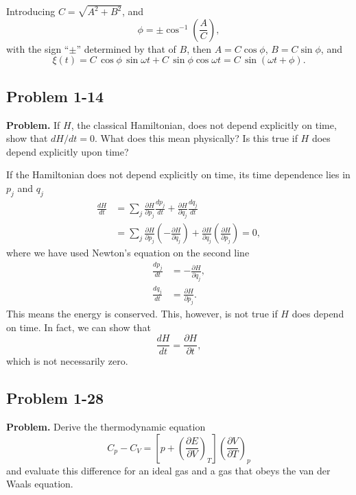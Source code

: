 \documentclass[twocolumn, 10pt]{article}
\numberwithin{equation}{section}
\newenvironment{problem}
{\par\medskip\sffamily \color{problue}
  \textbf{Problem. }\ignorespaces}
{\medskip}
\newenvironment{solution}[1][\empty]
{\par\medskip
  \textbf{\ifx\empty#1{Solution.}\relax\else{#1}\fi} \ignorespaces}
{\medskip}
\begin{document}
\begin{solution}
Introducing $C = \sqrt{A^2 + B^2}$,
and
$$\phi = \pm \cos^{-1} \left( \frac A C \right),$$
with the sign ``$\pm$'' determined by that of $B$,
then $A = C \cos\phi$, $B = C \sin\phi$, and
$$
\xi(t) = C \, \cos\phi \, \sin \omega t + C \, \sin\phi \cos \omega t
= C \, \sin(\omega t + \phi).
$$
\end{solution}


\subsection{Problem 1-14}

\begin{problem}
If $H$, the classical Hamiltonian, does not depend explicitly on time,
show that $dH/dt = 0$.
What does this mean physically?
Is this true if $H$ does depend explicitly upon time?
\end{problem}

\begin{solution}
If the Hamiltonian does not depend explicitly on time,
its time dependence lies in $p_j$ and $q_j$
\begin{align*}
  \frac{dH}{dt}
  &= \sum_j
  \frac{ \partial H } { \partial p_j}
  \frac{ d p_j } { d t }
   +
  \frac{ \partial H } { \partial q_j}
  \frac{ d q_j } { d t }
  \\
  &= \sum_j
  \frac{ \partial H } { \partial p_j}
  \left( - \frac{ \partial H } { \partial q_j} \right)
   +
  \frac{ \partial H } { \partial q_j}
  \left( \frac{ \partial H } { \partial p_j} \right)
  = 0,
\end{align*}
where we have used Newton's equation
on the second line
\begin{align*}
  \frac{ d p_j } { d t }
  &=
  - \frac{ \partial H } { \partial q_j}
  ,
  \\
  \frac{ d q_j } { d t }
  &= \frac{ \partial H } { \partial p_j}
  .
\end{align*}
This means the energy is conserved.
This, however, is not true if $H$ does depend on time.
%
In fact, we can show that
$$
  \frac{ d H } { d t }
  =
  \frac{ \partial H } { \partial t }
  ,
$$
which is not necessarily zero.
\end{solution}


\subsection{Problem 1-28}

\begin{problem}
  Derive the thermodynamic equation
  \begin{equation}
    C_p - C_V
    = \left[ p + \left( \frac{ \partial E } { \partial V } \right)_T \right]
    \left( \frac{ \partial V } { \partial T } \right)_p
    \label{eq:CpCV1}
  \end{equation}
  and evaluate this difference for an ideal gas
  and a gas that obeys the van der Waals equation.
\end{problem}
\end{document}
